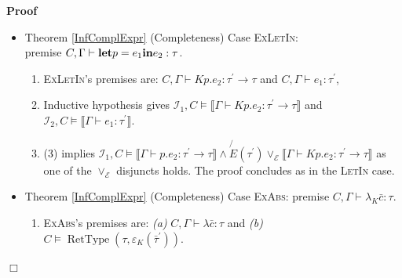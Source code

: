 \documentclass{article}
\newcommand{\tmem}[1]{{\em #1\/}}
\newcommand{\tmname}[1]{\textsc{#1}}
\newcommand{\tmop}[1]{\ensuremath{\operatorname{#1}}}
\newcommand{\tmstrong}[1]{\textbf{#1}}
\newenvironment{proof}{\noindent\textbf{Proof\ }}{\hspace*{\fill}$\Box$\medskip}
\begin{document}
\begin{proof}
\begin{itemize}
\begin{enumerate}
      \item As the premise $\tmop{PV} (C, \Gamma) = \varnothing$ gives
      disjoint domains for the $\mathcal{I}_i$, we have $\mathcal{I}, C \vDash
      \llbracket \Gamma \vdash e_1 : \tau^{\prime} \rrbracket \wedge \left(
      \llbracket \Gamma \vdash p.e_2 : \tau^{\prime} \rightarrow \tau
      \rrbracket \wedge \not{E} (\tau^{\prime}) \vee_{\mathcal{E}} \llbracket
      \Gamma \vdash K p.e_2 : \tau^{\prime} \rightarrow \tau \rrbracket
      \right)$ for $\mathcal{I}=\mathcal{I}_1 \mathcal{I}_2$.
      
      \item $\mathcal{I}, C \vDash \exists \alpha_0 . \llbracket \Gamma \vdash
      e_1 : \alpha_0 \rrbracket \wedge \left( \llbracket \Gamma \vdash p.e_2 :
      \alpha_0 \rightarrow \tau \rrbracket \wedge \not{E} (\alpha_0)
      \vee_{\mathcal{E}} \llbracket \Gamma \vdash K p.e_2 : \alpha_0
      \rightarrow \tau \rrbracket \right)$ by abstracting $\alpha_0 =
      \tau^{\prime}$.
    \end{enumerate}
    \item Theorem \ref{InfComplExpr} (Completeness) Case {\tmname{ExLetIn}}:\\
    premise $C, \Gamma \vdash \text{{\tmstrong{let}}} p = e_1 
    \text{{\tmstrong{in}}} e_2 : \tau$.
    \begin{enumerate}
      \item {\tmname{ExLetIn}}'s premises are: $C, \Gamma \vdash K p.e_2 :
      \tau^{\prime} \rightarrow \tau$ and $C, \Gamma \vdash e_1 :
      \tau^{\prime}$,
      
      \item Inductive hypothesis gives $\mathcal{I}_1, C \vDash \llbracket
      \Gamma \vdash K p.e_2 : \tau^{\prime} \rightarrow \tau \rrbracket$ and
      $\mathcal{I}_2, C \vDash \llbracket \Gamma \vdash e_1 : \tau^{\prime}
      \rrbracket$.
      
      \item (3) implies $\mathcal{I}_1, C \vDash \llbracket \Gamma \vdash
      p.e_2 : \tau^{\prime} \rightarrow \tau \rrbracket \wedge \not{E}
      (\tau^{\prime}) \vee_{\mathcal{E}} \llbracket \Gamma \vdash K p.e_2 :
      \tau^{\prime} \rightarrow \tau \rrbracket$ as one of the
      $\vee_{\mathcal{E}}$ disjuncts holds. The proof concludes as in the
      {\tmname{LetIn}} case.
    \end{enumerate}
    \item Theorem \ref{InfComplExpr} (Completeness) Case {\tmname{ExAbs}}:
    premise $C, \Gamma \vdash \lambda_K \bar{c} : \tau$.
    \begin{enumerate}
      \item {\tmname{ExAbs}}'s premises are: {\tmem{(a)}} $C, \Gamma \vdash
      \lambda \bar{c} : \tau$ and {\tmem{(b)}} $C \vDash \tmop{RetType} (\tau,
      \varepsilon_K (\bar{\tau}^{\prime}))$.
      

\end{enumerate}
\end{itemize}
\end{proof}
\end{document}
